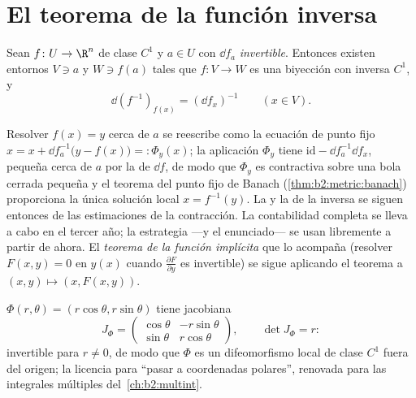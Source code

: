 \section{El teorema de la función inversa}

\begin{theorem}\label{thm:b2:diffcalc:inverse}
Sean $f \colon U \to \R^n$ de clase $C^1$ y $a \in U$ con $\dd f_a$
\emph{invertible}. Entonces existen entornos  $V \ni a$ y $W
\ni f(a)$ tales que $f \colon V \to W$ es una biyección con inversa
$C^1$, y
\[
\dd (f^{-1})_{f(x)} = (\dd f_x)^{-1} \qquad (x \in V).
\]
\end{theorem}
\admitted

\begin{remark}
Resolver $f(x) = y$ cerca de $a$ se reescribe como la ecuación de
punto fijo $x = x + \dd f_a^{-1}\bigl(y - f(x)\bigr) =: \Phi_y(x)$;
la aplicación $\Phi_y$ tiene  $\mathrm{id} - \dd
f_a^{-1}\dd f_x$, pequeña cerca de $a$ por la  de $\dd f$,
de modo que $\Phi_y$ es contractiva sobre una bola cerrada pequeña y
el teorema del punto fijo de Banach
(\cref{thm:b2:metric:banach}) proporciona la única solución local $x
= f^{-1}(y)$. La  y la  de la inversa se
siguen entonces de las estimaciones de la contracción. La
contabilidad completa se lleva a cabo en el tercer año; la estrategia
---y el enunciado--- se usan libremente a partir de ahora. El
\emph{teorema de la función implícita} que lo acompaña (resolver
$F(x, y) = 0$ en $y(x)$ cuando $\frac{\partial F}{\partial y}$ es
invertible) se sigue aplicando el teorema a $(x, y) \mapsto (x,
F(x,y))$.
\end{remark}

\begin{example}\label{ex:b2:diffcalc:polar}
$\Phi(r, \theta) = (r\cos\theta, r\sin\theta)$ tiene jacobiana
\[
J_\Phi = \begin{pmatrix} \cos\theta & -r\sin\theta\\ \sin\theta &
r\cos\theta \end{pmatrix},
\qquad \det J_\Phi = r :
\]
invertible para $r \neq 0$, de modo que $\Phi$ es un difeomorfismo
local de clase $C^1$ fuera del origen; la licencia para ``pasar a
coordenadas polares'', renovada para las integrales múltiples del~\cref{ch:b2:multint}.
\end{example}

